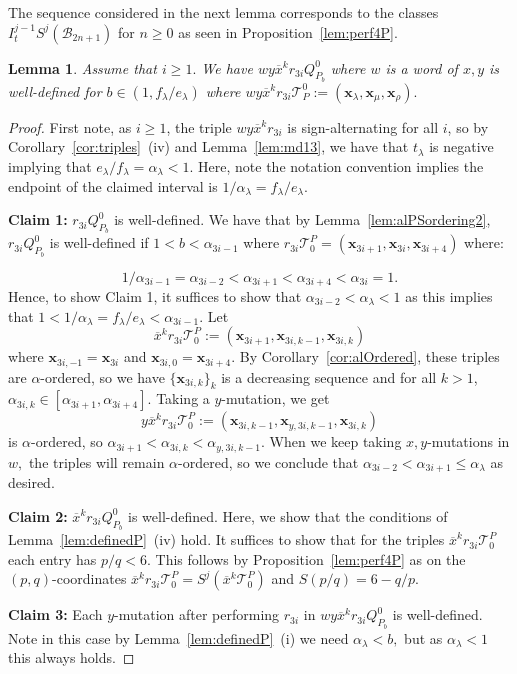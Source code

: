 \documentclass[11pt, reqno]{amsart}
\newtheorem{lemma}[thm]{Lemma}
\theoremstyle{remark}
\numberwithin{equation}{subsection}
\numberwithin{figure}{section}
\theoremstyle{customremark}
\newcommand{\Tt}{\mathcal{T}}
\newcommand{\ov}{\overline}
\newcommand{\al}{{\alpha}}
\newcommand{\la}{{\lambda}}
\begin{document}
 The sequence considered in the next lemma corresponds to the classes $I_t^{j-1}S^j(\mathcal{B}_{2n+1})$ for $n \geq 0$ as seen in Proposition~\ref{lem:perf4P}. 
\begin{lemma} \label{lem:poly1Q}
    Assume that $i\geq 1.$
    We have $wy\ov{x}^kr_{3i}Q_{P_b}^0$ where $w$ is a word of $x,y$ is well-defined for $b \in (1,f_\la/e_\la)$ where $wy\ov{x}^kr_{3i}\Tt_{P}^0:=(\bm{x}_\la,\bm{x}_\mu,\bm{x}_\rho).$
\end{lemma}
\begin{proof}

    First note, as $i \geq 1$, the triple $wy\ov{x}^kr_{3i}$ is sign-alternating for all $i$, so by Corollary~\ref{cor:triples}~(iv) and Lemma~\ref{lem:md13}, we have that $t_\la$ is negative implying that $e_\la/f_\la=\al_\la<1.$ Here, note the notation convention implies the endpoint of the claimed interval is $1/\al_\la=f_\la/e_\la$.  

    \textbf{Claim 1:} $r_{3i}Q_{P_b}^0$ is well-defined. 
    We have that by Lemma~\ref{lem:alPSordering2}, $r_{3i}Q_{P_b}^0$ is well-defined if $1<b<\al_{3i-1}$ where $r_{3i}\Tt_0^P=(\bm{x}_{3i+1},\bm{x}_{3i},\bm{x}_{3i+4})$ where:
  
    \[ 1/\al_{3i-1}=\al_{3i-2}<\al_{3i+1}<\al_{3i+4}<\al_{3i}=1.\]
    Hence, to show Claim 1, it suffices to show that $\al_{3i-2}<\al_\la<1$ as this implies that $1<1/\al_\la=f_\la/e_\la<\al_{3i-1}.$
Let \[\ov{x}^kr_{3i}\Tt_0^P:=(\bm{x}_{3i+1},\bm{x}_{3i,k-1},\bm{x}_{3i,k})\]
where $\bm{x}_{3i,-1}=\bm{x}_{3i}$ and $\bm{x}_{3i,0}=\bm{x}_{3i+4}.$
By Corollary~\ref{cor:alOrdered}, these triples are $\al$-ordered, so we have $\{\bm{x}_{3i,k}\}_k$ is a decreasing sequence and for all $k >1$, $\al_{3i,k} \in [\al_{3i+1},\al_{3i+4}].$
Taking a $y$-mutation, we get 
\[y\ov{x}^kr_{3i}\Tt_0^P:=(\bm{x}_{3i,k-1},\bm{x}_{y,3i,k-1},\bm{x}_{3i,k})\] is $\al$-ordered, so $\al_{3i+1}<\al_{3i,k}<\al_{y,3i,k-1}.$
When we keep taking $x,y$-mutations in $w,$ the triples will remain $\al$-ordered, so we conclude that $\al_{3i-2}<\al_{3i+1}\leq \al_\la$ as desired. 

    \textbf{Claim 2:} $\ov{x}^kr_{3i}Q_{P_b}^0$ is well-defined. Here, we show that the conditions of Lemma~\ref{lem:definedP}~(iv) hold. It suffices to show that for the triples $\ov{x}^kr_{3i}\Tt_0^P$ each entry has $p/q<6.$ This follows by Proposition~\ref{lem:perf4P} as on the $(p,q)$-coordinates $\ov{x}^kr_{3i}\Tt_0^P=S^j(\ov{x}^k\Tt_0^P)$ and $S(p/q)=6-q/p.$ 

   \textbf{Claim 3:} Each $y$-mutation after performing $r_{3i}$ in $wy\ov{x}^kr_{3i}Q_{P_b}^0$ is well-defined. Note in this case by Lemma~\ref{lem:definedP}~(i) we need $\al_\la<b,$ but as $\al_\la<1$ this always holds. 
   



\end{proof}
\end{document}
